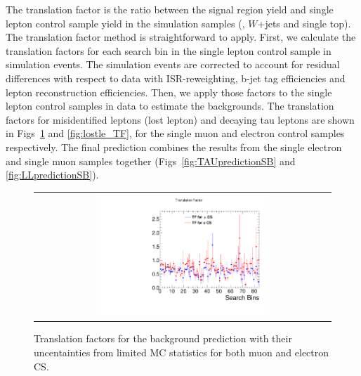 The translation factor is the ratio between the signal region yield and single lepton control sample yield in the simulation samples (\ttbar, $W$+jets and single top). The translation factor method is straightforward to apply. First, we calculate the translation factors for each search bin in the single lepton control sample in simulation events. The simulation events are corrected to account for residual differences with respect to data with ISR-reweighting, b-jet tag efficiencies and lepton reconstruction efficiencies. Then, we apply those factors to the single lepton control samples in data to estimate the backgrounds. The translation factors for misidentified leptons (lost lepton) and decaying tau leptons are shown in Figs~\ref{fig:hadtau_TF} and \ref{fig:lostle_TF}, for the single muon and electron control samples respectively. The final prediction combines the results from the single electron and single muon samples together (Figs~\ref{fig:TAUpredictionSB} and \ref{fig:LLpredictionSB}). 

\begin{figure}[htbp]
  \begin{center}
  \begin{tabular}{c}
  \includegraphics[angle=0,width=0.60\textwidth]{sections/mc4/Backgrounds/TF/figures/comp_TF_hadtau_comb.pdf}
  \end{tabular}
  \caption{Translation factors for the \tauh background prediction with their uncentainties from limited MC statistics for both muon and electron CS.}
    \label{fig:hadtau_TF}
  \end{center}
\end{figure}


